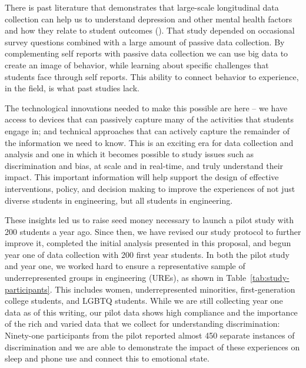 There is past literature that demonstrates that large-scale longitudinal data collection can help us to understand depression and other mental health factors and how they relate to student outcomes (\eg \cite{wang2014studentlife}). That study depended on occasional survey questions combined with a large amount of passive data collection. By complementing self reports with passive data collection we can use big data to create an image of behavior, while learning about specific challenges that students face through self reports. This ability to connect behavior to experience, in the field, is what past studies lack.  %

The technological innovations needed to make this possible are here -- we have access to devices that can passively capture many of the activities that students engage in; and technical approaches that can actively capture the remainder of the information we need to know. This is an exciting era for data collection and analysis and one in which it becomes possible to study issues such as discrimination and bias, at scale and in real-time, and truly understand their impact. This important information will help support the design of effective interventions, policy, and decision making to improve the experiences of not just diverse students in engineering, but all students in engineering. 
 
These insights led us to raise seed money necessary to launch a pilot study with 200 students a year ago. Since then, we have revised our study protocol to further improve it, completed the initial analysis presented in this proposal, and begun year one of data collection with 200 first year students. In both the pilot study and year one, we worked hard to ensure a representative sample of underrepresented groups in engineering (UREs), as shown in Table~\ref{tab:study-participants}. This includes women, underrepresented minorities, first-generation college students, and LGBTQ students. 
While we are still collecting year one data as of this writing, our pilot data shows high compliance and the importance of the rich and varied data that we collect for understanding discrimination: Ninety-one participants from the pilot reported almost 450 separate instances of discrimination and we are able to demonstrate the impact of these experiences on sleep and phone use and connect this to emotional state.  \paula{}

